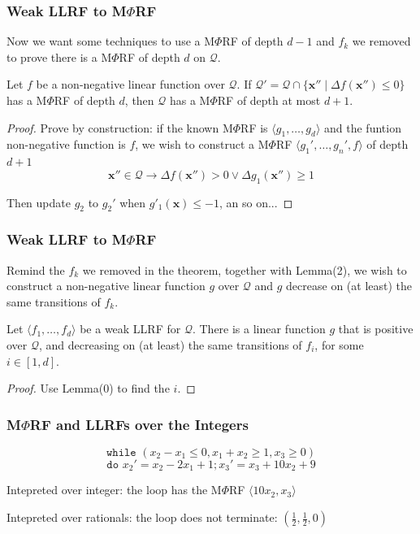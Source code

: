 \documentclass[11pt]{beamer}
\begin{document}
\begin{frame}\frametitle{Weak LLRF to M$\Phi$RF}
Now we want some techniques to use a M$\Phi$RF of depth $d - 1$ and $f_k$ we removed to prove there is a M$\Phi$RF of depth $d$ on $\mathcal{Q}$. 
\begin{lemma}[2]
Let $f$ be a non-negative linear function over $\mathcal{Q}$. If $\mathcal{Q}' = \mathcal{Q}\cap \{\textbf{x} '' \mid \Delta f(\textbf{x} '') \le 0\}$ has a M$\Phi$RF of depth $d$, then $\mathcal{Q}$ has a M$\Phi$RF of depth at most $d + 1$.
\end{lemma}
\begin{proof}
Prove by construction: if the known M$\Phi$RF is $\langle g_1, \ldots, g_d \rangle$ and the funtion non-negative function is $f$, we wish to construct a  M$\Phi$RF $\langle g_1', \ldots, g_n', f\rangle$ of depth $d + 1$
\[\textbf{x}''\in \mathcal{Q} \rightarrow \Delta f(\textbf{x}'') > 0 \vee \Delta g_1(\textbf{x}'') \ge 1\]

Then update $g_2$ to $g_2'$ when $g'_1(\textbf{x}) \le -1$, an so on...

\end{proof}

\end{frame}

\begin{frame}\frametitle{Weak LLRF to M$\Phi$RF}
Remind the $f_k$ we removed in the theorem, together with Lemma(2), we wish to construct a non-negative linear function $g$ over $\mathcal{Q}$ and $g$ decrease on (at least) the same transitions of $f_k$.
\begin{lemma}[3]
Let $\langle f_1, \ldots, f_d\rangle$ be a weak LLRF for $\mathcal{Q}$. There is a linear function $g$ that is positive over $\mathcal{Q}$, and decreasing on (at least) the same transitions of $f_i$, for some $i\in [1,d]$.

\end{lemma}

\begin{proof}
Use Lemma(0) to find the $i$.
\end{proof}

\end{frame}
\begin{frame}\frametitle{M$\Phi$RF and LLRFs over the Integers}
\begin{example}
\[\texttt{while } (x_2 - x_1 \le 0, x_1 + x_2 \ge 1, x_3 \ge 0) 
\]
\[\texttt{do }x_2 ' = x_2 - 2x_1 + 1; x_3 ' = x_3 + 10x_2 + 9\]
\end{example}
Intepreted over integer: the loop has the M$\Phi$RF $\langle 10x_2, x_3\rangle$

Intepreted over rationals: the loop does not terminate: $(\frac{1}{2}, \frac{1}{2}, 0)$


\end{frame}
\end{document}
